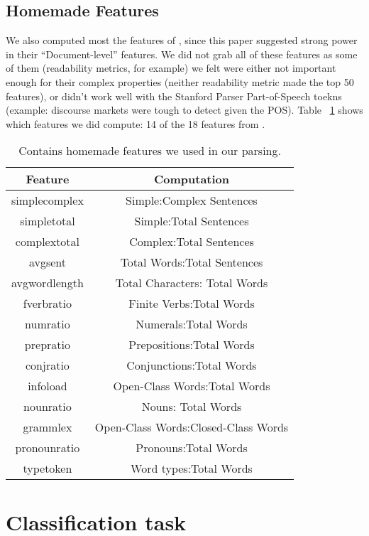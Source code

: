 \documentclass[10pt]{article}
\begin{document}
\subsection{Homemade Features}
We also computed most the features of \cite{homemade}, since this paper suggested strong power in their ``Document-level'' features. We did not grab all of these features as some of them (readability metrics, for example) we felt were either not important enough for their complex properties (neither readability metric made the top 50 features), or didn't work well with the Stanford Parser Part-of-Speech toekns (example: discourse markets were tough to detect given the POS). Table ~\ref{HMTable} shows which features we did compute: 14 of the 18 features from \cite{homemade}.


\begin{table}[h!]
\begin{center}
\begin{tabular}{|c|c|}
\hline
Feature & Computation \\\hline
simplecomplex & Simple:Complex Sentences \\
simpletotal & Simple:Total Sentences \\
complextotal & Complex:Total Sentences \\
avgsent & Total Words:Total Sentences \\
avgwordlength & Total Characters: Total Words \\
fverbratio & Finite Verbs:Total Words\\
numratio & Numerals:Total Words \\ 
prepratio & Prepositions:Total Words \\ 
conjratio & Conjunctions:Total Words \\
infoload & Open-Class Words:Total Words \\
nounratio & Nouns: Total Words \\
grammlex & Open-Class Words:Closed-Class Words \\
pronounratio & Pronouns:Total Words \\
typetoken & Word types:Total Words \\\hline
\end{tabular}
\caption{Contains homemade features we used in our parsing. \label{HMTable}}
\end{center}
\end{table}




\section{Classification task}
\end{document}
